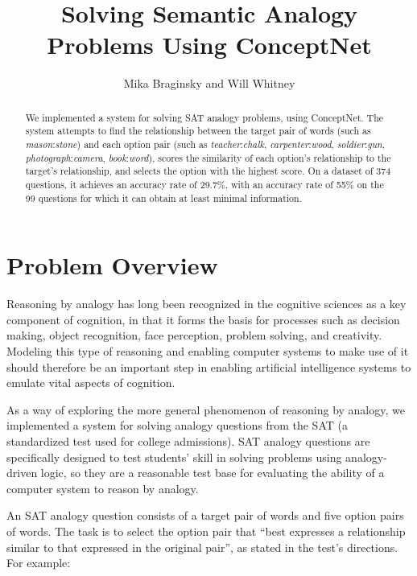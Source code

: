 \documentclass[11pt]{article}
\begin{document}

\title{Solving Semantic Analogy Problems Using ConceptNet}
\author{Mika Braginsky and Will Whitney}
\maketitle

\begin{abstract}
We implemented a system for solving SAT analogy problems, using ConceptNet. The system attempts to find the relationship between the target pair of words (such as \emph{mason}:\emph{stone}) and each option pair (such as \emph{teacher}:\emph{chalk}, \emph{carpenter}:\emph{wood}, \emph{soldier}:\emph{gun}, \emph{photograph}:\emph{camera}, \emph{book}:\emph{word}), scores the similarity of each option's relationship to the target's relationship, and selects the option with the highest score. On a dataset of 374 questions, it achieves an accuracy rate of 29.7\%, with an accuracy rate of 55\% on the 99 questions for which it can obtain at least minimal information.
\end{abstract}

\section{Problem Overview}

Reasoning by analogy has long been recognized in the cognitive sciences as a key component of cognition, in that it forms the basis for processes such as decision making, object recognition, face perception, problem solving, and creativity. Modeling this type of reasoning and enabling computer systems to make use of it should therefore be an important step in enabling artificial intelligence systems to emulate vital aspects of cognition.

As a way of exploring the more general phenomenon of reasoning by analogy, we implemented a system for solving analogy questions from the SAT (a standardized test used for college admissions). SAT analogy questions are specifically designed to test students' skill in solving problems using analogy-driven logic, so they are a reasonable test base for evaluating the ability of a computer system to reason by analogy.

An SAT analogy question consists of a target pair of words and five option pairs of words. The task is to select the option pair that ``best expresses a relationship similar to that expressed in the original pair'', as stated in the test's directions. For example:
\end{document}
